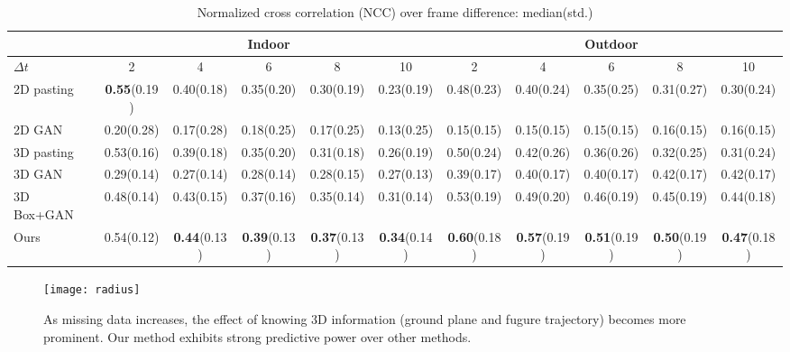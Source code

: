 \documentclass[10pt,twocolumn,letterpaper]{article}
\begin{document}
\begin{table*}[th]
\centering
\scriptsize
\begin{tabular}{l|c|c|c|c|c||c|c|c|c|c}
\hline
& \multicolumn{5}{c||}{Indoor}& \multicolumn{5}{c}{Outdoor}\\
\hline
$\Delta t$ & 2 & 4 & 6 & 8 & 10 & 2 & 4 & 6 & 8 & 10\\\hline
2D pasting&\textbf{0.55}(0.19)  &  0.40(0.18)  &  0.35(0.20) &   0.30(0.19)  &  0.23(0.19) & 0.48(0.23)  &   0.40(0.24) &    0.35(0.25)   &  0.31(0.27)  &   0.30(0.24)\\

2D GAN&0.20(0.28)   & 0.17(0.28)  &  0.18(0.25)  &  0.17(0.25) &   0.13(0.25) &    0.15(0.15)  &  0.15(0.15)&    0.15(0.15)   & 0.16(0.15) &    0.16(0.15) \\
    
3D pasting&0.53(0.16)  &  0.39(0.18)  &  0.35(0.20)   & 0.31(0.18)  &  0.26(0.19) & 0.50(0.24)  &  0.42(0.26) &   0.36(0.26)  &  0.32(0.25)    & 0.31(0.24) \\
       
3D GAN&0.29(0.14)  &  0.27(0.14)  &  0.28(0.14) &   0.28(0.15)  &  0.27(0.13)  &  0.39(0.17)  &  0.40(0.17)&    0.40(0.17) &   0.42(0.17) &   0.42(0.17)\\

3D Box+GAN&0.48(0.14)  &  0.43(0.15)  &  0.37(0.16)  &  0.35(0.14)  &  0.31(0.14) &  0.53(0.19)    & 0.49(0.20)&    0.46(0.19) &   0.45(0.19)  &  0.44(0.18) \\

Ours&0.54(0.12)  &  \textbf{0.44}(0.13)  &  \textbf{0.39}(0.13)  &  \textbf{0.37}(0.13)  &  \textbf{0.34}(0.14) & \textbf{0.60}(0.18)  &  \textbf{0.57}(0.19) &  \textbf{0.51}(0.19) &   \textbf{0.50}(0.19)&    \textbf{0.47}(0.18)\\
\hline
\end{tabular}
\caption[Normalized cross correlation (NCC) over frame difference: median(std.)]{Normalized cross correlation (NCC) over frame difference: median(std.)}
\label{table:per}
\end{table*}

\begin{figure}[h]
  \centering  
  \texttt{[image: radius]}
  \caption{As missing data increases, the effect of knowing 3D information (ground plane and fugure trajectory) becomes more prominent. Our method exhibits strong predictive power over other methods.} \label{Fig:radius}
\end{figure}
\end{document}
